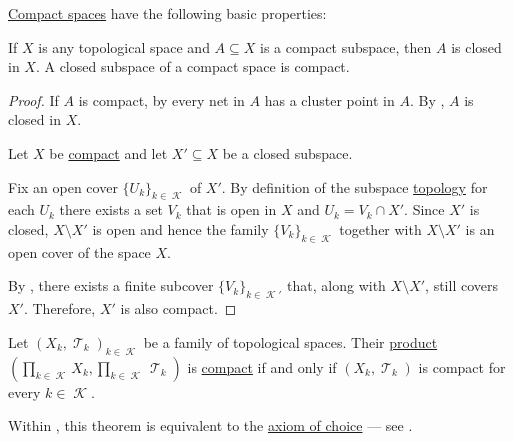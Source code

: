 \begin{proposition}\label{thm:def:compact_space}
  \hyperref[def:compact_space]{Compact spaces} have the following basic properties:
  \begin{thmenum}
     If \( X \) is any topological space and \( A \subseteq X \) is a compact subspace, then \( A \) is closed in \( X \).
     A closed subspace of a compact space is compact.
  \end{thmenum}
\end{proposition}
\begin{proof}
   If \( A \) is compact, by  every net in \( A \) has a cluster point in \( A \). By , \( A \) is closed in \( X \).

   Let \( X \) be \hyperref[def:compact_space]{compact} and let \( X' \subseteq X \) be a closed subspace.

  Fix an open cover \( \{ U_k \}_{k \in \mscrK} \) of \( X' \). By definition of the subspace \hyperref[def:topological_subspace]{topology} for each \( U_k \) there exists a set \( V_k \) that is open in \( X \) and \( U_k = V_k \cap X' \). Since \( X' \) is closed, \( X \setminus X' \) is open and hence the family \( \{ V_k \}_{k \in \mscrK} \) together with \( X \setminus X' \) is an open cover of the space \( X \).

  By , there exists a finite subcover \( \{ V_k \}_{k \in \mscrK'} \) that, along with \( X \setminus X' \), still covers \( X' \). Therefore, \( X' \) is also compact.
\end{proof}

\begin{theorem}\label{thm:tychonoffs_product_theorem}
  Let \( { (X_k, \mscrT_k) }_{k \in \mscrK} \) be a family of topological spaces. Their \hyperref[def:topological_product]{product} \( (\prod_{k \in \mscrK} X_k, \prod_{k \in \mscrK} \mscrT_k) \) is \hyperref[def:compact_space]{compact} if and only if \( (X_k, \mscrT_k) \) is compact for every \( k \in \mscrK \).

  Within \hyperref[def:zfc]{}, this theorem is equivalent to the \hyperref[def:zfc/choice]{axiom of choice} --- see .
\end{theorem}

